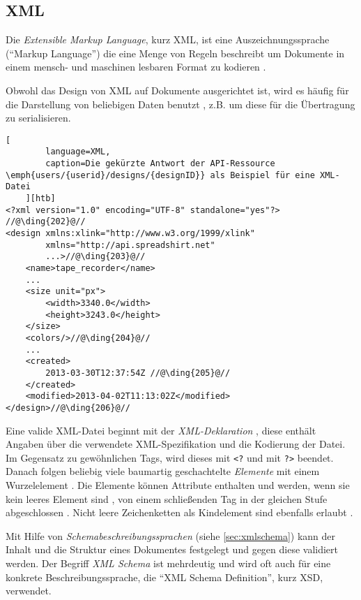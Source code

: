 \subsection{XML}

\begin{thesisDefinition}[XML]
Die \emph{Extensible Markup Language}, kurz \gls{XML}, ist eine Auszeichnungssprache (\enquote{Markup Language}) die eine Menge von Regeln beschreibt um Dokumente in einem mensch- und maschinen lesbaren Format zu kodieren \cite{XML10Specification}.
\end{thesisDefinition}
Obwohl das Design von XML auf Dokumente ausgerichtet ist, wird es häufig für die Darstellung von beliebigen Daten benutzt \cite{wiki:xml}, z.B. um diese für die Übertragung zu serialisieren.

\begin{lstlisting}[
        language=XML, 
        caption=Die gekürzte Antwort der API-Ressource \emph{users/{userid}/designs/{designID}} als Beispiel für eine XML-Datei
    ][htb]
<?xml version="1.0" encoding="UTF-8" standalone="yes"?> //@\ding{202}@//
<design xmlns:xlink="http://www.w3.org/1999/xlink" 
        xmlns="http://api.spreadshirt.net" 
        ...>//@\ding{203}@//
    <name>tape_recorder</name>
    ...
    <size unit="px">
        <width>3340.0</width>
        <height>3243.0</height>
    </size>
    <colors/>//@\ding{204}@//
    ...
    <created>
        2013-03-30T12:37:54Z //@\ding{205}@//
    </created>
    <modified>2013-04-02T11:13:02Z</modified>
</design>//@\ding{206}@//
\end{lstlisting}

Eine valide XML-Datei beginnt mit der \emph{XML-Deklaration} , diese enthält Angaben über die verwendete XML-Spezifikation und die Kodierung der Datei. 
Im Gegensatz zu gewöhnlichen Tags, wird dieses mit \texttt{<?} und mit \texttt{?>} beendet. 
Danach folgen beliebig viele baumartig geschachtelte \emph{Elemente} mit einem Wurzelelement . Die Elemente können Attribute enthalten und werden, wenn sie kein leeres Element sind , von einem schließenden Tag in der gleichen Stufe abgeschlossen . Nicht leere Zeichenketten als Kindelement sind ebenfalls erlaubt .

Mit Hilfe von \emph{Schemabeschreibungssprachen} (siehe \cref{sec:xmlschema}) kann der Inhalt und die Struktur eines Dokumentes festgelegt und gegen diese validiert werden. Der Begriff \emph{XML Schema} ist mehrdeutig und wird oft auch für eine konkrete Beschreibungssprache, die \enquote{XML Schema Definition}, kurz \gls{XSD}, verwendet.
